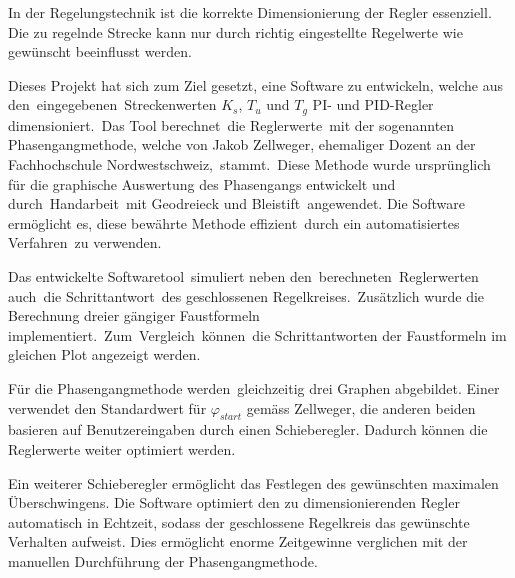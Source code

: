 In  der   Regelungstechnik  ist   die  korrekte  Dimensionierung   der  Regler
essenziell. Die  zu  regelnde  Strecke  kann nur  durch  richtig  eingestellte
Regelwerte wie gew\"unscht beeinflusst werden. 
 

Dieses  Projekt  hat sich  zum  Ziel  gesetzt,  eine Software  zu  entwickeln,
welche  aus   den eingegebenen Streckenwerten  $K_s$,  $T_u$  und   $T_g$  PI-
und  PID-Regler  dimensioniert. Das  Tool  berechnet die  Reglerwerte mit  der
sogenannten   Phasengangmethode,  welche   von  Jakob   Zellweger,  ehemaliger
Dozent  an  der  Fachhochschule Nordwestschweiz, stammt. Diese  Methode  wurde
urspr\"unglich  f\"ur die  graphische  Auswertung  des Phasengangs  entwickelt
und  durch Handarbeit mit  Geodreieck und  Bleistift angewendet. Die  Software
erm\"oglicht es, diese bew\"ahrte  Methode effizient durch ein automatisiertes
Verfahren zu verwenden.
 

Das  entwickelte   Softwaretool simuliert  neben  den berechneten Reglerwerten
auch die    Schrittantwort des     geschlossenen    Regelkreises. Zus\"atzlich
wurde      die       Berechnung      dreier       g\"angiger      Faustformeln
implementiert. Zum Vergleich k\"onnen die Schrittantworten der Faustformeln im
gleichen Plot angezeigt werden.


F\"ur die Phasengangmethode werden gleichzeitig drei Graphen abgebildet. Einer
verwendet  den   Standardwert  f\"ur  $\varphi_{start}$   gem\"ass  Zellweger,
die    anderen   beiden    basieren   auf    Benutzereingaben   durch    einen
Schieberegler. Dadurch k\"onnen die Reglerwerte weiter optimiert werden.


Ein  weiterer  Schieberegler  erm\"oglicht  das  Festlegen  des  gew\"unschten
maximalen  \"Uberschwingens. Die Software  optimiert den  zu dimensionierenden
Regler  automatisch  in  Echtzeit,  sodass  der  geschlossene  Regelkreis  das
gew\"unschte   Verhalten   aufweist. Dies  erm\"oglicht   enorme   Zeitgewinne
verglichen mit der manuellen Durchf\"uhrung der Phasengangmethode.
